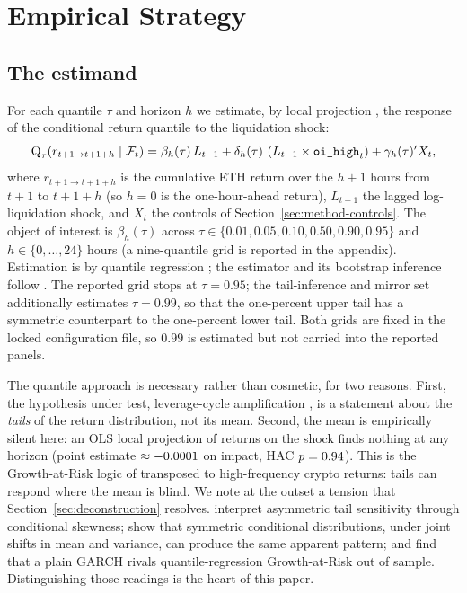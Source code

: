 \section{Empirical Strategy}
\label{sec:method}

\subsection{The estimand}

For each quantile $\tau$ and horizon $h$ we estimate, by local projection
\citep{jorda2005}, the response of the conditional return quantile to the
liquidation shock:
\begin{equation}
\label{eq:qlp}
\operatorname{Q}_{\tau}\!\left(r_{t+1 \to t+1+h} \mid \mathcal{F}_t\right)
 = \beta_h(\tau)\, L_{t-1}
 + \delta_h(\tau)\, \left(L_{t-1} \times \texttt{oi\_high}_t\right)
 + \gamma_h(\tau)' X_t ,
\end{equation}
where $r_{t+1 \to t+1+h}$ is the cumulative ETH return over the $h+1$ hours from $t+1$ to $t+1+h$ (so $h=0$ is the one-hour-ahead return),
$L_{t-1}$ the lagged log-liquidation shock, and $X_t$ the controls of
Section~\ref{sec:method-controls}. The object of interest is
$\beta_h(\tau)$ across $\tau \in \{0.01, 0.05, 0.10, 0.50, 0.90, 0.95\}$
and $h \in \{0, \dots, 24\}$ hours (a nine-quantile grid is reported in the
appendix). Estimation is by quantile regression \citep{koenker1978}; the
estimator and its bootstrap inference follow \citet{han2024}. The reported
grid stops at $\tau = 0.95$; the tail-inference and mirror set additionally
estimates $\tau = 0.99$, so that the one-percent upper tail has a symmetric
counterpart to the one-percent lower tail. Both grids are fixed in the locked
configuration file, so $0.99$ is estimated but not carried into the reported
panels.

The quantile approach is necessary rather than cosmetic, for two reasons.
First, the hypothesis under test, leverage-cycle amplification
\citep{geanakoplos2010,brunnermeier2009}, is a statement about the
\emph{tails} of the return distribution, not its mean. Second, the mean is
empirically silent here: an OLS local projection of returns on the shock
finds nothing at any horizon (point estimate $\approx -0.0001$ on
impact, HAC $p = 0.94$). This is the Growth-at-Risk logic of
\citet{adrian2019}
transposed to high-frequency crypto returns: tails can respond where the
mean is blind. We note at the outset a tension that
Section~\ref{sec:deconstruction} resolves. \citet{adrian2019} interpret
asymmetric tail sensitivity through conditional skewness;
\citet{carriero2024} show that symmetric conditional distributions, under joint shifts in mean and variance, can produce the same apparent pattern; and \citet{brownlees2021} find that a
plain GARCH rivals quantile-regression Growth-at-Risk out of sample.
Distinguishing those readings is the heart of this paper.

